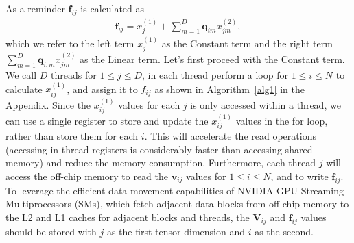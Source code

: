 \par As a reminder $\mathbf{f}_{ij}$ is calculated as 
\begin{gather}
    \mathbf{f}_{ij} = x^{(1)}_j + \sum_{m=1}^{D}{\mathbf{q}_{im}x^{(2)}_{jm}},
\end{gather}
which we refer to the left term $x^{(1)}_j$ as the Constant term and the right term $\sum_{m=1}^{D}{\mathbf{q}_{i,m}x^{(2)}_{jm}}$ as the Linear term. Let's first proceed with the Constant term. We call $D$ threads for $1\leq j\leq D$, in each thread perform a loop for $1\leq i\leq N$ to calculate $x^{(1)}_{ij}$, and assign it to $f_{ij}$ as shown in Algorithm~\ref{alg1} in the Appendix. Since the $x^{(1)}_{ij}$ values for each $j$ is only accessed within a thread, we can use a single register to store and update the $x^{(1)}_{ij}$ values in the for loop, rather than store them for each $i$. This will accelerate the read operations (accessing in-thread registers is considerably faster than accessing shared memory) and reduce the memory consumption. Furthermore, each thread $j$ will access the off-chip memory to read the $\mathbf{v}_{ij}$ values for $1\leq i\leq N$, and to write $\mathbf{f}_{ij}$. To leverage the efficient data movement capabilities of NVIDIA GPU Streaming Multiprocessors (SMs), which fetch adjacent data blocks from off-chip memory to the L2 and L1 caches for adjacent blocks and threads, the $\mathbf{V}_{ij}$ and $\mathbf{f}_{ij}$ values should be stored with $j$ as the first tensor dimension and $i$ as the second.

